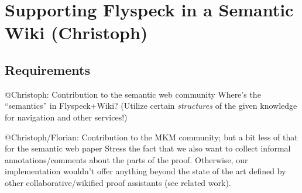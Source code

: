 \documentclass{llncs}
\begin{document}
\section{Supporting Flyspeck in a Semantic Wiki (Christoph)}

\subsection{Requirements}
\label{sec:req}


\begin{todo}{@Christoph: Contribution to the semantic web community}
  Where's the ``semantics'' in Flyspeck+Wiki? (Utilize certain \emph{structures} of the
  given knowledge for navigation and other services!)
\end{todo}

\begin{todo}{@Christoph/Florian: Contribution to the MKM community; but a bit less of that
    for the semantic web paper}
  Stress the fact that we also want to collect informal annotations/comments about the
  parts of the proof.  Otherwise, our implementation wouldn't offer anything beyond the
  state of the art defined by other collaborative/wikified proof assistants (see related
  work).
\end{todo}
\end{document}
